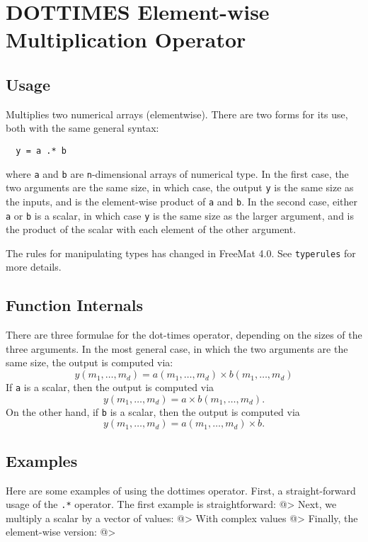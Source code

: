 \section{DOTTIMES Element-wise Multiplication Operator}

\subsection{Usage}

Multiplies two numerical arrays (elementwise).  There are two forms
for its use, both with the same general syntax:
\begin{verbatim}
  y = a .* b
\end{verbatim}
where \verb|a| and \verb|b| are \verb|n|-dimensional arrays of numerical type.  In the
first case, the two arguments are the same size, in which case, the 
output \verb|y| is the same size as the inputs, and is the element-wise
product of \verb|a| and \verb|b|.  In the second case, either \verb|a| or \verb|b| is a scalar, 
in which case \verb|y| is the same size as the larger argument,
and is the product of the scalar with each element of the other argument.


The rules for manipulating types has changed in FreeMat 4.0.  See \verb|typerules|
for more details.

\subsection{Function Internals}

There are three formulae for the dot-times operator, depending on the
sizes of the three arguments.  In the most general case, in which 
the two arguments are the same size, the output is computed via:
\[
y(m_1,\ldots,m_d) = a(m_1,\ldots,m_d) \times b(m_1,\ldots,m_d)
\]
If \verb|a| is a scalar, then the output is computed via
\[
y(m_1,\ldots,m_d) = a \times b(m_1,\ldots,m_d).
\]
On the other hand, if \verb|b| is a scalar, then the output is computed via
\[
y(m_1,\ldots,m_d) = a(m_1,\ldots,m_d) \times b.
\]
\subsection{Examples}

Here are some examples of using the dottimes operator.  First, a 
straight-forward usage of the \verb|.*| operator.  The first example
is straightforward:
@>
Next, we multiply a scalar by a vector of values:
@>
With complex values
@>
Finally, the element-wise version:
@>
